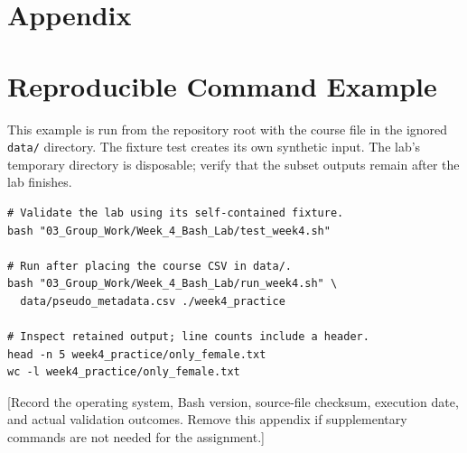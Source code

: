 \documentclass[12pt,letterpaper]{article}
\begin{document}
\newpage
\section*{Appendix}
\section*{Reproducible Command Example}
This example is run from the repository root with the course file in the
ignored \texttt{data/} directory. The fixture test creates its own synthetic
input. The lab's temporary directory is disposable; verify that the subset
outputs remain after the lab finishes.

\begin{singlespace}
\begin{lstlisting}
# Validate the lab using its self-contained fixture.
bash "03_Group_Work/Week_4_Bash_Lab/test_week4.sh"

# Run after placing the course CSV in data/.
bash "03_Group_Work/Week_4_Bash_Lab/run_week4.sh" \
  data/pseudo_metadata.csv ./week4_practice

# Inspect retained output; line counts include a header.
head -n 5 week4_practice/only_female.txt
wc -l week4_practice/only_female.txt
\end{lstlisting}
\end{singlespace}

[Record the operating system, Bash version, source-file checksum, execution
date, and actual validation outcomes. Remove this appendix if supplementary
commands are not needed for the assignment.]
\end{document}
